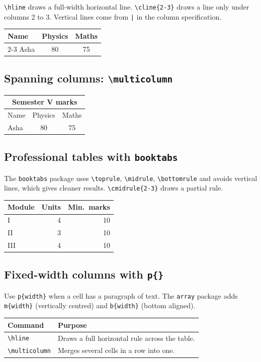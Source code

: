 \documentclass[11pt,a4paper]{article}
\begin{document}
\verb|\hline| draws a full-width horizontal line. \verb|\cline{2-3}|
draws a line only under columns 2 to 3. Vertical lines come from
\texttt{|} in the column specification.

\begin{tabular}{|l|c|c|}
\hline
Name & Physics & Maths \\
\cline{2-3}
Asha & 80      & 75    \\
\hline
\end{tabular}

\subsection{Spanning columns: \texttt{\textbackslash multicolumn}}

\begin{tabular}{|l|c|c|}
\hline
\multicolumn{3}{|c|}{Semester V marks} \\
\hline
Name & Physics & Maths \\
\hline
Asha & 80      & 75    \\
\hline
\end{tabular}

\subsection{Professional tables with \texttt{booktabs}}

The \texttt{booktabs} package uses \verb|\toprule|, \verb|\midrule|,
\verb|\bottomrule| and avoids vertical lines, which gives cleaner
results. \verb|\cmidrule{2-3}| draws a partial rule.

\begin{tabular}{l r r}
\toprule
Module & Units & Min.\ marks \\
\midrule
I   & 4 & 10 \\
II  & 3 & 10 \\
III & 4 & 10 \\
\bottomrule
\end{tabular}

\subsection{Fixed-width columns with \texttt{p\{\}}}

Use \texttt{p\{width\}} when a cell has a paragraph of text. The
\texttt{array} package adds \texttt{m\{width\}} (vertically centred)
and \texttt{b\{width\}} (bottom aligned).

\begin{tabular}{p{3.5cm} p{8cm}}
\toprule
Command & Purpose \\
\midrule
\verb|\hline| & Draws a full horizontal rule across the table. \\
\verb|\multicolumn| & Merges several cells in a row into one. \\
\bottomrule
\end{tabular}
\end{document}
